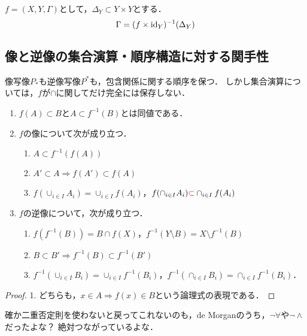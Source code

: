 \documentclass[uplatex,dvipdfmx]{jsreport}
\begin{document}
\begin{example}
    $f=(X,Y,\Gamma)$として，$\Delta_Y\subset Y\times Y$とする．
    \[\Gamma=(f\times\mathrm{id}_Y)^{-1}(\Delta_Y)\]
\end{example}

\subsection{像と逆像の集合演算・順序構造に対する関手性}

\begin{screen}
    像写像$P_*$も逆像写像$P^*$も，包含関係に関する順序を保つ．
    しかし集合演算については，$f$が$\cap$に関してだけ完全には保存しない．
\end{screen}

\begin{proposition}[像と逆像と集合演算の絡み合い]\mbox{}
    \begin{enumerate}
        \item $f(A)\subset B$と$A\subset f^{-1}(B)$とは同値である．
        \item $f$の像について次が成り立つ．
        \begin{enumerate}[(1)]
            \item $A\subset f^{-1}(f(A))$
            \item $A'\subset A\Rightarrow f(A')\subset f(A)$
            \item $f(\cup_{i\in I}A_i)=\cup_{i\in I}f(A_i)$，$f(\cap_{i\in I}A_i)\textcolor{red}{\subset}\cap_{i\in I}f(A_i)$
        \end{enumerate}
        \item $f$の逆像について，次が成り立つ．
        \begin{enumerate}[(1)]
            \item $f(f^{-1}(B))=B\cap f(X)$，$f^{-1}(Y\setminus B)=X\setminus f^{-1}(B)$
            \item $B\subset B'\Rightarrow f^{-1}(B)\subset f^{-1}(B')$
            \item $f^{-1}(\cup_{i\in I}B_i)=\cup_{i\in I}f^{-1}(B_i)$，$f^{-1}(\cap_{i\in I}B_i)=\cap_{i\in I}f^{-1}(B_i)$．
        \end{enumerate}
    \end{enumerate}
\end{proposition}
\begin{proof}
    1. どちらも，$x\in A\Rightarrow f(x)\in B$という論理式の表現である．
\end{proof}
\begin{remark}
    確か二重否定則を使わないと戻ってこれないのも，de Morganのうち，$\lnot\forall$や$\lnot\land$だったよな？
    絶対つながっているよな．
\end{remark}
\end{document}
